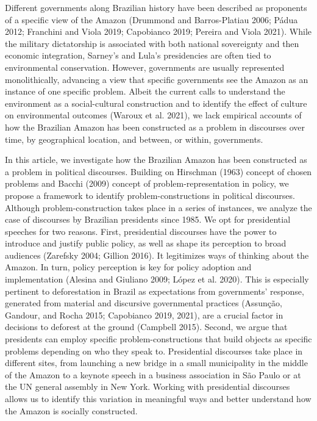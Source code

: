 \documentclass[
]{article}
\begin{document}
Different governments along Brazilian history have been described as
proponents of a specific view of the Amazon (Drummond and Barros-Platiau
2006; Pádua 2012; Franchini and Viola 2019; Capobianco 2019; Pereira and
Viola 2021). While the military dictatorship is associated with both
national sovereignty and then economic integration, Sarney's and Lula's
presidencies are often tied to environmental conservation. However,
governments are usually represented monolithically, advancing a view
that specific governments see the Amazon as an instance of one specific
problem. Albeit the current calls to understand the environment as a
social-cultural construction and to identify the effect of culture on
environmental outcomes (Waroux et al. 2021), we lack empirical accounts
of how the Brazilian Amazon has been constructed as a problem in
discourses over time, by geographical location, and between, or within,
governments.

In this article, we investigate how the Brazilian Amazon has been
constructed as a problem in political discourses. Building on Hirschman
(1963) concept of chosen problems and Bacchi (2009) concept of
problem-representation in policy, we propose a framework to identify
problem-constructions in political discourses. Although
problem-construction takes place in a series of instances, we analyze
the case of discourses by Brazilian presidents since 1985. We opt for
presidential speeches for two reasons. First, presidential discourses
have the power to introduce and justify public policy, as well as shape
its perception to broad audiences (Zarefsky 2004; Gillion 2016). It
legitimizes ways of thinking about the Amazon. In turn, policy
perception is key for policy adoption and implementation (Alesina and
Giuliano 2009; López et al. 2020). This is especially pertinent to
deforestation in Brazil as expectations from governments' response,
generated from material and discursive governmental practices (Assunção,
Gandour, and Rocha 2015; Capobianco 2019, 2021), are a crucial factor in
decisions to deforest at the ground (Campbell 2015). Second, we argue
that presidents can employ specific problem-constructions that build
objects as specific problems depending on who they speak to.
Presidential discourses take place in different sites, from launching a
new bridge in a small municipality in the middle of the Amazon to a
keynote speech in a business association in São Paulo or at the UN
general assembly in New York. Working with presidential discourses
allows us to identify this variation in meaningful ways and better
understand how the Amazon is socially constructed.
\end{document}
